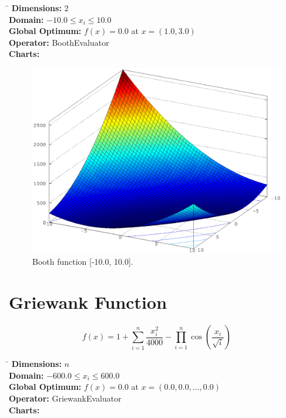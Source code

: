 \documentclass[12pt, a4paper]{article}
\begin{document}
		\begin{tabbing}
			\hspace{5cm}\=\kill
			\textbf{Dimensions:}     \> $2$ \\
			\textbf{Domain:}         \> $-10.0 \leq x_i \leq 10.0$ \\
			\textbf{Global Optimum:} \> $f(x) = 0.0$ at $x = (1.0, 3.0)$ \\
			\textbf{Operator:}       \> BoothEvaluator \\
			\textbf{Charts:}         \> \\
		\end{tabbing}

		\begin{figure}[ht]
			\includegraphics[width=\textwidth]{Images/Booth}
			\caption{Booth function [-10.0, 10.0].}
		\end{figure}

	\newpage

	\section*{Griewank Function}
		\begin{equation*}
			f(x) = 1 + \sum_{i=1}^n \frac{x_i^2}{4000} - \prod_{i=1}^n \cos(\frac{x_i}{\sqrt i})
		\end{equation*}

		\begin{tabbing}
			\hspace{5cm}\=\kill
			\textbf{Dimensions:}     \> $n$ \\
			\textbf{Domain:}         \> $-600.0 \leq x_i \leq 600.0$ \\
			\textbf{Global Optimum:} \> $f(x) = 0.0$ at $x = (0.0, 0.0, \dots, 0.0)$ \\
			\textbf{Operator:}       \> GriewankEvaluator \\
			\textbf{Charts:}         \> \\
		\end{tabbing}
\end{document}
